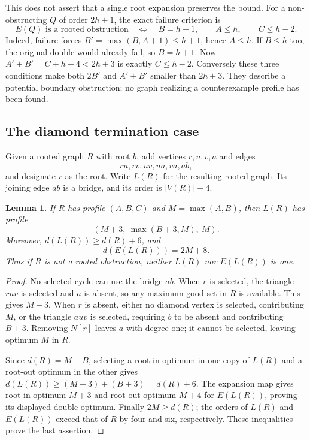 \documentclass[11pt]{article}
\newtheorem{lemma}[theorem]{Lemma}
\begin{document}
This does not assert that a single root expansion preserves the bound.
For a non-obstructing $Q$ of order $2h+1$, the exact failure criterion is
\[
 E(Q)\text{ is a rooted obstruction}
 \quad\Longleftrightarrow\quad
 B=h+1,\qquad A\leq h,\qquad C\leq h-2.
\]
Indeed, failure forces $B'=\max(B,A+1)\leq h+1$, hence $A\leq h$.
If $B\leq h$ too, the original double would already fail, so $B=h+1$.
Now $A'+B'=C+h+4<2h+3$ is exactly $C\leq h-2$.
Conversely these three conditions make both $2B'$ and $A'+B'$
smaller than $2h+3$. They describe a potential boundary obstruction;
no graph realizing a counterexample profile has been found.

\subsection{The diamond termination case}
Given a rooted graph $R$ with root $b$, add vertices $r,u,v,a$
and edges
\[
 ru,rv,uv,ua,va,ab,
\]
and designate $r$ as the root. Write $L(R)$ for the resulting rooted
graph. Its joining edge $ab$ is a bridge, and its order is $|V(R)|+4$.

\begin{lemma}\label{lem:root-diamond}
If $R$ has profile $(A,B,C)$ and $M=\max(A,B)$, then $L(R)$ has
profile
\[
 (M+3,\ \max(B+3,M),\ M).
\]
Moreover, $d(L(R))\geq d(R)+6$, and
\[
 d(E(L(R)))=2M+8.
\]
Thus if $R$ is not a rooted obstruction, neither $L(R)$ nor
$E(L(R))$ is one.
\end{lemma}
\begin{proof}
No selected cycle can use the bridge $ab$. When $r$ is selected,
the triangle $ruv$ is selected and $a$ is absent, so any maximum
good set in $R$ is available. This gives $M+3$.
When $r$ is absent, either no diamond vertex is selected, contributing
$M$, or the triangle $auv$ is selected, requiring $b$ to be absent
and contributing $B+3$. Removing $N[r]$ leaves $a$ with degree one;
it cannot be selected, leaving optimum $M$ in $R$.

Since $d(R)=M+B$, selecting a root-in optimum in one copy of $L(R)$
and a root-out optimum in the other gives
$d(L(R))\geq(M+3)+(B+3)=d(R)+6$.
The expansion map gives root-in optimum $M+3$ and root-out optimum
$M+4$ for $E(L(R))$, proving its displayed double optimum.
Finally $2M\geq d(R)$; the orders of $L(R)$ and $E(L(R))$ exceed
that of $R$ by four and six, respectively. These inequalities prove
the last assertion.
\end{proof}
\end{document}
